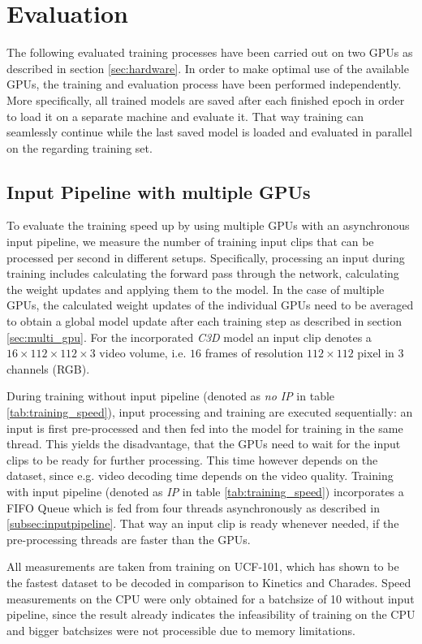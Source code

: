 \section{Evaluation}
The following evaluated training processes have been carried out on two GPUs as described in section \ref{sec:hardware}.
In order to make optimal use of the available GPUs, the training and evaluation process have been performed independently.
More specifically, all trained models are saved after each finished epoch in order to load it on a separate machine and evaluate it.
That way training can seamlessly continue while the last saved model is loaded and evaluated in parallel on the regarding training set.


\subsection{Input Pipeline with multiple GPUs}
To evaluate the training speed up by using multiple GPUs with an asynchronous input pipeline, we measure the number of training input clips that can be processed per second in different setups.
Specifically, processing an input during training includes calculating the forward pass through the network, calculating the weight updates and applying them to the model.
In the case of multiple GPUs, the calculated weight updates of the individual GPUs need to be averaged to obtain a global model update after each training step as described in section \ref{sec:multi_gpu}.
For the incorporated \textit{C3D} model an input clip denotes a $16 \times 112 \times 112 \times 3$ video volume, i.e. $16$ frames of resolution $112 \times 112$ pixel in $3$ channels (RGB).

During training without input pipeline (denoted as \textit{no IP} in table \ref{tab:training_speed}), input processing and training are executed sequentially: an input is first pre-processed and then fed into the model for training in the same thread.
This yields the disadvantage, that the GPUs need to wait for the input clips to be ready for further processing.
This time however depends on the dataset, since e.g. video decoding time depends on the video quality.
Training with input pipeline (denoted as \textit{IP} in table \ref{tab:training_speed}) incorporates a FIFO Queue which is fed from four threads asynchronously as described in \ref{subsec:inputpipeline}.
That way an input clip is ready whenever needed, if the pre-processing threads are faster than the GPUs.

All measurements are taken from training on UCF-101, which has shown to be the fastest dataset to be decoded in comparison to Kinetics and Charades.
Speed measurements on the CPU were only obtained for a batchsize of 10 without input pipeline, since the result already indicates the infeasibility of training on the CPU and bigger batchsizes were not processible due to memory limitations.

